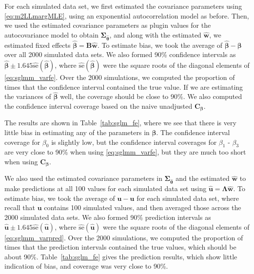 \documentclass[12pt, titlepage]{article}
\begin{document}
For each simulated data set, we first estimated the covariance parameters using \eqref{eq:m2LLmargMLE}, using an exponential autocorrelation model as before. Then, we used the estimated covariance parameters as plugin values for the autocovariance model to obtain $\boldsymbol{\Sigma}_{\hat{\boldsymbol{\theta}}}$, and along with the estimated $\hat{\mathbf{w}}$, we estimated fixed effects $\hat{\boldsymbol{\beta}} = \mathbf{B}\hat{\mathbf{w}}$.  To estimate bias, we took the average of $\hat{\boldsymbol{\beta}} - \boldsymbol{\beta}$ over all 2000 simulated data sets. We also formed 90\% confidence intervals as $\hat{\boldsymbol{\beta}} \pm 1.645 \widehat{\textrm{se}}(\hat{\boldsymbol{\beta}})$, where $\widehat{\textrm{se}}(\hat{\boldsymbol{\beta}})$ were the square roots of the diagonal elements of \eqref{eq:sglmm_varfe}.  Over the 2000 simulations, we computed the proportion of times that the confidence interval contained the true value.  If we are estimating the variances of $\hat{\boldsymbol{\beta}}$ well, the coverage should be close to 90\%. We also computed the confidence interval coverage based on the naive unadjusted $\mathbf{C}_{\boldsymbol{\beta}}$. 

The results are shown in Table~\ref{tab:sglm_fe}, where we see that there is very little bias in estimating any of the parameters in $\boldsymbol{\beta}$.  The confidence interval coverage for $\beta_{0}$ is slightly low, but the confidence interval coverages for $\beta_{1}$ - $\beta_{3}$ are very close to 90\% when using \eqref{eq:sglmm_varfe}, but they are much too short when using $\mathbf{C}_{\boldsymbol{\beta}}$.

We also used the estimated covariance parameters in $\boldsymbol{\Sigma}_{\hat{\boldsymbol{\theta}}}$ and the estimated $\hat{\mathbf{w}}$ to make predictions at all 100 values for each simulated data set using $\hat{\mathbf{u}} = \boldsymbol{\Lambda}\hat{\mathbf{w}}$.  To estimate bias, we took the average of $\hat{\mathbf{u}} - \mathbf{u}$ for each simulated data set, where recall that $\mathbf{u}$ contains 100 simulated values, and then averaged those across the 2000 simulated data sets.  We also formed 90\% prediction intervals as $\hat{\mathbf{u}} \pm 1.645 \widehat{\textrm{se}}(\hat{\mathbf{u}})$, where $\widehat{\textrm{se}}(\hat{\mathbf{u}})$ were the square roots of the diagonal elements of \eqref{eq:sglmm_varpred}. Over the 2000 simulations, we computed the proportion of times that the prediction intervals contained the true values, which should be about 90\%. Table~\ref{tab:sglm_fe} gives the prediction results, which show little indication of bias, and coverage was very close to 90\%.
\end{document}
